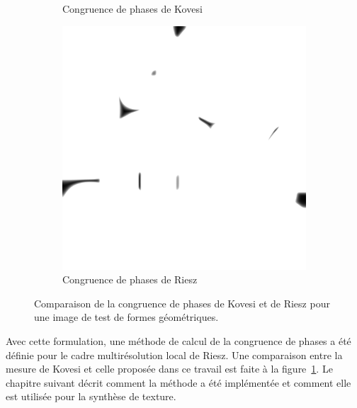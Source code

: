 \begin{figure}
\begin{subfigure}{.3\textwidth}
        \caption{Congruence de phases de Kovesi}
    \end{subfigure}
    \hfill
    \begin{subfigure}{.3\textwidth}
        \centering
        \includegraphics[width=\textwidth]{contenu/resources/images/geometric_shapes_pc_riesz}
        \caption{Congruence de phases de Riesz}
    \end{subfigure}

    \caption[Comparaison de la congruence de phases de Kovesi et de Riesz]{Comparaison de la congruence de phases de Kovesi et de Riesz pour une image de test de formes géométriques.}
    \label{fig:phase-congruency-riesz}
\end{figure}

\bigskip

Avec cette formulation, une méthode de calcul de la congruence de phases a été définie pour le cadre multirésolution local de Riesz. Une comparaison entre la mesure de Kovesi et celle proposée dans ce travail est faite à la figure~\ref{fig:phase-congruency-riesz}. Le chapitre suivant décrit comment la méthode a été implémentée et comment elle est utilisée pour la synthèse de texture.
